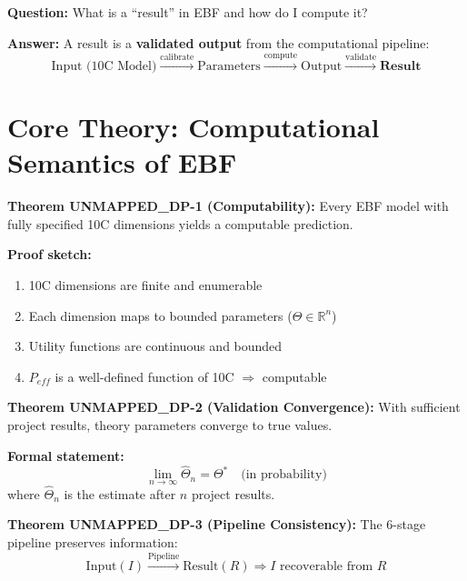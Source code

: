 \begin{tcolorbox}[colback=red!5!white, colframe=red!75!black,
    title=\textbf{The Fundamental Question}]

\textbf{Question:} What is a ``result'' in EBF and how do I compute it?

\textbf{Answer:} A result is a \textbf{validated output} from the computational pipeline:
\begin{equation}
\text{Input (10C Model)} \xrightarrow{\text{calibrate}} \text{Parameters} \xrightarrow{\text{compute}} \text{Output} \xrightarrow{\text{validate}} \textbf{Result}
\end{equation}

\end{tcolorbox}

\section{Core Theory: Computational Semantics of EBF}
\label{sec:dp-theory}

\begin{tcolorbox}[colback=blue!3!white, colframe=blue!60!black,
    title=\textbf{Theoretical Foundation: What Makes EBF Computable?}]

\textbf{Theorem UNMAPPED_DP-1 (Computability):}
Every EBF model with fully specified 10C dimensions yields a computable prediction.

\textbf{Proof sketch:}
\begin{enumerate}[nosep]
    \item 10C dimensions are finite and enumerable
    \item Each dimension maps to bounded parameters ($\Theta \in \mathbb{R}^n$)
    \item Utility functions are continuous and bounded
    \item $P_{eff}$ is a well-defined function of 10C $\Rightarrow$ computable
\end{enumerate}

\textbf{Theorem UNMAPPED_DP-2 (Validation Convergence):}
With sufficient project results, theory parameters converge to true values.

\textbf{Formal statement:}
\begin{equation}
\lim_{n \rightarrow \infty} \hat{\Theta}_n = \Theta^* \quad \text{(in probability)}
\end{equation}
where $\hat{\Theta}_n$ is the estimate after $n$ project results.

\textbf{Theorem UNMAPPED_DP-3 (Pipeline Consistency):}
The 6-stage pipeline preserves information:
\begin{equation}
\text{Input}(I) \xrightarrow{\text{Pipeline}} \text{Result}(R) \Rightarrow I \text{ recoverable from } R
\end{equation}

\end{tcolorbox}

